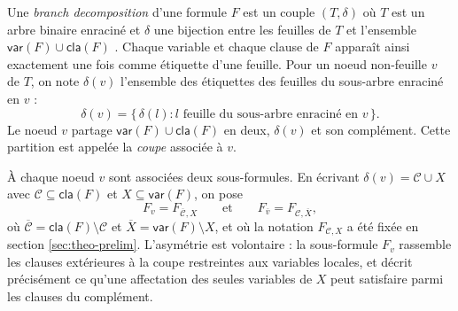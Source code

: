 \documentclass[11pt,a4paper]{report}
\theoremstyle{plain}
\theoremstyle{definition}
\begin{document}
Une \emph{branch decomposition} d'une formule $F$ est un couple
$(T, \delta)$ où $T$ est un arbre binaire enraciné et $\delta$ une
bijection entre les feuilles de $T$ et l'ensemble
$\mathsf{var}(F) \cup \mathsf{cla}(F)$ \cite{saether2015}. Chaque
variable et chaque clause de $F$ apparaît ainsi exactement une fois
comme étiquette d'une feuille. Pour un noeud non-feuille $v$ de $T$,
on note $\delta(v)$ l'ensemble des étiquettes des feuilles du
sous-arbre enraciné en $v$ :
\[
  \delta(v) = \{\, \delta(l) : l \text{ feuille du sous-arbre enraciné en } v\,\}.
\]
Le noeud $v$ partage $\mathsf{var}(F) \cup \mathsf{cla}(F)$ en deux,
$\delta(v)$ et son complément. Cette partition est appelée la
\emph{coupe} associée à $v$.

À chaque noeud $v$ sont associées deux sous-formules. En écrivant
$\delta(v) = \mathcal{C} \cup X$ avec
$\mathcal{C} \subseteq \mathsf{cla}(F)$ et $X \subseteq \mathsf{var}(F)$,
on pose
\[
  F_v = F_{\overline{\mathcal{C}}, X}
  \qquad \text{et} \qquad
  F_{\overline{v}} = F_{\mathcal{C}, \overline{X}},
\]
où $\overline{\mathcal{C}} = \mathsf{cla}(F) \setminus \mathcal{C}$ et
$\overline{X} = \mathsf{var}(F) \setminus X$, et où la notation
$F_{\mathcal{C}, X}$ a été fixée en section \ref{sec:theo-prelim}.
L'asymétrie est volontaire : la sous-formule $F_v$ rassemble les
clauses extérieures à la coupe restreintes aux variables locales, et
décrit précisément ce qu'une affectation des seules variables de $X$
peut satisfaire parmi les clauses du complément.
\end{document}
